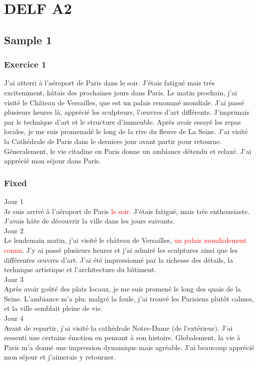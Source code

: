 \documentclass{book}
\begin{document}
\chapter{DELF A2}

    \section{Sample 1}
        \subsection{Exercice 1}
            J'ai atterri à l'aéroport de Paris dans le soir. J'étais fatigué mais trés excitemment, hâtais des prochaines jours dans Paris.
            Le matin prochain, j'ai visité le Château de Versailles, que est un palais renommé mondiale. 
            J'ai passé plusieurs heures là, apprécié les sculpteurs, l'œuvres d'art différents.
            J'imprimais par le technique d'art et le structure d'immeuble. 
            Après avoir essayé les repas locales, je me suis promenadé le long de la rive du fleuve de La Seine.
            J'ai visité la Cathédrale de Paris dans le derniere jour avant partir pour retourne. 
            Géneralement, le vie citadine en Paris donne un ambiance détendu et relaxé. J'ai apprécié mon séjour dans Paris.
        
        \subsection*{Fixed}
            Jour 1 \\
            Je suis arrivé à l'aéroport de Paris \textcolor{red}{le soir}. J'étais fatigué, mais très enthousiaste. J'avais hâte de découvrir la ville dans les jours suivants. \\
            Jour 2 \\
            Le lendemain matin, j'ai visité le château de Versailles, \textcolor{red}{un palais mondialement connu}. J'y ai passé plusieurs heures et j'ai admiré les sculptures ainsi que les différentes œuvres d'art.
            J'ai été impressionné par la richesse des détails, la technique artistique et l'architecture du bâtiment.
            \\ Jour 3 \\
            Après avoir goûté des plats locaux, je me suis promené le long des quais de la Seine. 
            L'ambiance m'a plu: malgré la foule, j'ai trouvé les Parisiens plutôt calmes, et la ville semblait pleine de vie.
            \\ Jour 4 \\
            Avant de repartir, j'ai visité la cathédrale Notre-Dame (de l'extérieur). 
            J'ai ressenti une certaine émotion en pensant à son histoire. 
            Globalement, la vie à Paris m'a donné une impression dynamique mais agréable. J'ai beaucoup apprécié mon séjour et j'aimerais y retourner.
\end{document}
